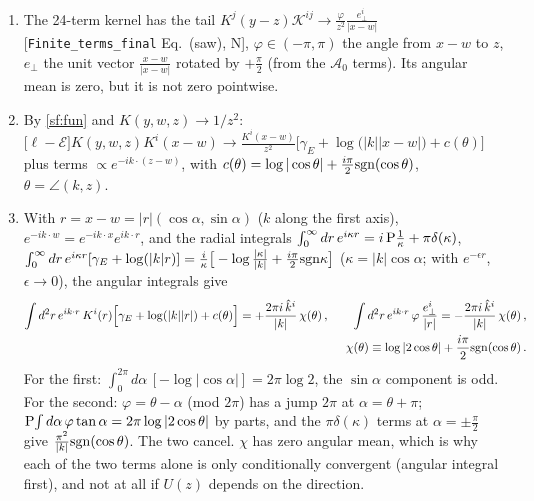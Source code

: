 \documentclass[10pt]{article}
\begin{document}
\begin{enumerate}
\item The 24-term kernel has the tail $K^{j}(y-z)\mathcal{K}^{ij}\to\frac{\varphi}{z^{2}}\frac{e_{\perp}^{i}}{|x-w|}$ [\texttt{Finite\_terms\_final} Eq.~(saw), N], $\varphi\in(-\pi,\pi)$ the angle from $x-w$ to $z$, $e_{\perp}$ the unit vector $\frac{x-w}{|x-w|}$ rotated by $+\frac{\pi}{2}$ (from the $\mathcal{A}_{0}$ terms). Its angular mean is zero, but it is not zero pointwise.
\item By \eqref{sf:fun} and $K(y,w,z)\to1/z^{2}$: $\big[\ell-\mathcal{E}\big]K(y,w,z)K^{i}(x-w)\to\frac{K^{i}(x-w)}{z^{2}}\Big[\gamma_{E}+\log\big(|k||x-w|\big)+c(\theta)\Big]$ plus terms $\propto e^{-ik\cdot(z-w)}$, with $c(\theta)=\log|\cos\theta|+\frac{i\pi}{2}{\rm sgn}(\cos\theta)$, $\theta=\angle(k,z)$.
\item With $r=x-w=|r|(\cos\alpha,\sin\alpha)$ ($k$ along the first axis), $e^{-ik\cdot w}=e^{-ik\cdot x}e^{ik\cdot r}$, and the radial integrals $\int_{0}^{\infty}dr\,e^{i\kappa r}=i\,{\rm P}\frac1\kappa+\pi\delta(\kappa)$, $\int_{0}^{\infty}dr\,e^{i\kappa r}[\gamma_{E}+\log(|k|r)]=\frac{i}{\kappa}\big[-\log\frac{|\kappa|}{|k|}+\frac{i\pi}{2}{\rm sgn}\kappa\big]$ ($\kappa=|k|\cos\alpha$; with $e^{-\epsilon r}$, $\epsilon\to0$), the angular integrals give
\begin{align}
\int d^{2}r\,e^{ik\cdot r}\,K^{i}(r)\Big[\gamma_{E}+\log(|k||r|)+c(\theta)\Big]=+\frac{2\pi i\,\hat k^{i}}{|k|}\,\chi(\theta)\,,\qquad
\int d^{2}r\,e^{ik\cdot r}\,\varphi\,\frac{e_{\perp}^{i}}{|r|}=-\frac{2\pi i\,\hat k^{i}}{|k|}\,\chi(\theta)\,,\notag\\ \chi(\theta)\equiv\log|2\cos\theta|+\frac{i\pi}{2}{\rm sgn}(\cos\theta)\,.\label{sf:id}
\end{align}
For the first: $\int_{0}^{2\pi}d\alpha\,[-\log|\cos\alpha|]=2\pi\log2$, the $\sin\alpha$ component is odd. For the second: $\varphi=\theta-\alpha$ (mod $2\pi$) has a jump $2\pi$ at $\alpha=\theta+\pi$; ${\rm P}\!\int d\alpha\,\varphi\tan\alpha=2\pi\log|2\cos\theta|$ by parts, and the $\pi\delta(\kappa)$ terms at $\alpha=\pm\frac{\pi}{2}$ give $\frac{\pi^{2}}{|k|}{\rm sgn}(\cos\theta)$. The two cancel. $\chi$ has zero angular mean, which is why each of the two terms alone is only conditionally convergent (angular integral first), and not at all if $U(z)$ depends on the direction.
\end{enumerate}
\end{document}
